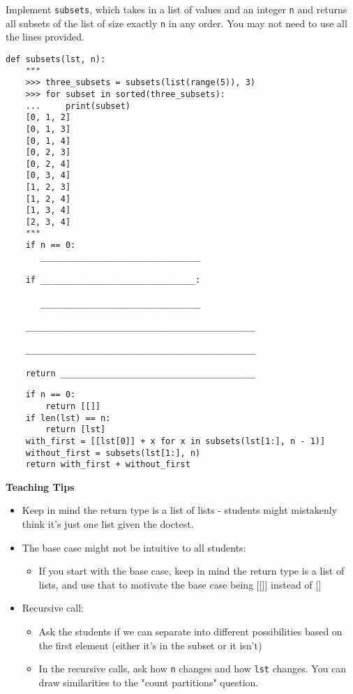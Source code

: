 \begin{blocksection}
\question Implement \lstinline$subsets$, which takes in a list of values and an
integer \lstinline$n$ and returns all subsets of the list of size exactly
\lstinline$n$ in any order. You may not need to use all the lines provided.

\begin{lstlisting}
def subsets(lst, n):
    """
    >>> three_subsets = subsets(list(range(5)), 3)
    >>> for subset in sorted(three_subsets):
    ...     print(subset)
    [0, 1, 2]
    [0, 1, 3]
    [0, 1, 4]
    [0, 2, 3]
    [0, 2, 4]
    [0, 3, 4]
    [1, 2, 3]
    [1, 2, 4]
    [1, 3, 4]
    [2, 3, 4]
    """
    if n == 0:
       ________________________________

    if _______________________________:

       ________________________________

    ______________________________________________

    ______________________________________________

    return _______________________________________

\end{lstlisting}
\end{blocksection}
\begin{blocksection}
\begin{solution}
\begin{lstlisting}
    if n == 0:
        return [[]]
    if len(lst) == n:
        return [lst]
    with_first = [[lst[0]] + x for x in subsets(lst[1:], n - 1)]
    without_first = subsets(lst[1:], n)
    return with_first + without_first
\end{lstlisting}
\end{solution}
\end{blocksection}

\begin{guide}
    \textbf{Teaching Tips}
    \begin{itemize}
       \item Keep in mind the return type is a list of lists - students might mistakenly think it’s just one list given the doctest.
       \item The base case might not be intuitive to all students:
       \begin{itemize}
           \item If you start with the base case, keep in mind the return type is a list of lists, and use that to motivate the base case being [[]] instead of []
       \end{itemize}
       \item Recursive call:
       \begin{itemize}
           \item Ask the students if we can separate into different possibilities based on the first element (either it's in the subset or it isn't)
           \item In the recursive calls, ask how \lstinline{n} changes and how \lstinline{lst} changes. You can draw similarities to the "count partitions" question.
       \end{itemize}
    \end{itemize}
 \end{guide}

